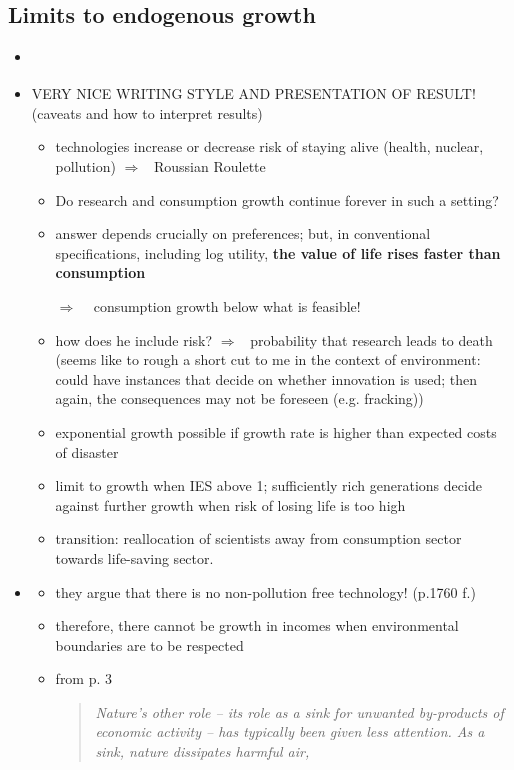 \documentclass[12pt]{article}
\newcommand{\ar}{$\Rightarrow$ \ }
\begin{document}
\subsection{Limits to endogenous growth}
\begin{itemize}
\item \cite{Stokey1998AreGrowth}
\item \cite{Jones2016LifeGrowth} VERY NICE WRITING STYLE AND PRESENTATION OF RESULT! (caveats and how to interpret results)
\begin{itemize}
\item technologies increase or decrease risk of staying alive (health, nuclear, pollution) \ar Roussian Roulette
\item Do research and consumption growth continue forever in such a setting? 
\item answer depends crucially on preferences; but, in conventional specifications, including log utility, \textbf{the value of life rises faster than consumption}
\item[\ar] consumption growth below what is feasible! 
\item how does he include risk? \ar probability that research leads to death (seems like to rough a short cut to me in the context of environment: could have instances that decide on whether innovation is used; then again, the consequences may not be foreseen (e.g. fracking))
\item exponential growth possible if growth rate is higher than expected costs of disaster
\item limit to growth when IES above 1; sufficiently rich generations decide against further growth when risk of losing life is too high
\item transition: reallocation of scientists away from consumption sector towards life-saving sector. 
\end{itemize}
\item \cite{Brock2005ChapterEmpirics}
\begin{itemize}
\item they argue that there is no non-pollution free technology! (p.1760 f.)
\item therefore, there cannot be growth in incomes when environmental boundaries are to be respected
\item from p. 3
\begin{quote}\textit{
Nature’s other role – its role as a sink for unwanted by-products of economic activity – has typically been given less attention. As a sink, nature dissipates harmful air,
}
\end{quote}
\end{itemize}
\end{itemize}
\end{document}
